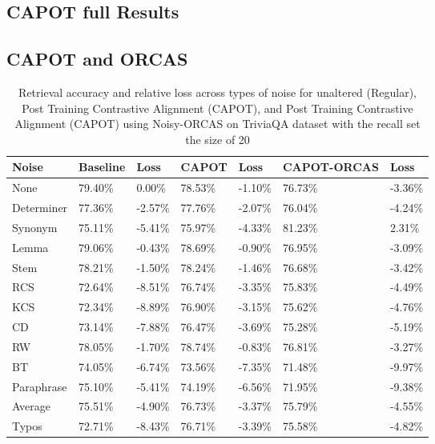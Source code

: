 \subsection{CAPOT full Results}
\label{app:capot}

\subsection{CAPOT and ORCAS}
\label{app:capot-orcas}
\begin{table*}[!ht]
    \centering
    \begin{tabular}{|l|l|l|l|l|l|l|}
    \hline
        Noise & Baseline & Loss & CAPOT & Loss & CAPOT-ORCAS & Loss \\ \hline
        None & 79.40\% & 0.00\% & 78.53\% & -1.10\% & 76.73\% & -3.36\% \\ \hline
        Determiner & 77.36\% & -2.57\% & 77.76\% & -2.07\% & 76.04\% & -4.24\% \\ \hline
        Synonym & 75.11\% & -5.41\% & 75.97\% & -4.33\% & 81.23\% & 2.31\% \\ \hline
        Lemma & 79.06\% & -0.43\% & 78.69\% & -0.90\% & 76.95\% & -3.09\% \\ \hline
        Stem & 78.21\% & -1.50\% & 78.24\% & -1.46\% & 76.68\% & -3.42\% \\ \hline
        RCS & 72.64\% & -8.51\% & 76.74\% & -3.35\% & 75.83\% & -4.49\% \\ \hline
        KCS & 72.34\% & -8.89\% & 76.90\% & -3.15\% & 75.62\% & -4.76\% \\ \hline
        CD & 73.14\% & -7.88\% & 76.47\% & -3.69\% & 75.28\% & -5.19\% \\ \hline
        RW & 78.05\% & -1.70\% & 78.74\% & -0.83\% & 76.81\% & -3.27\% \\ \hline
        BT & 74.05\% & -6.74\% & 73.56\% & -7.35\% & 71.48\% & -9.97\% \\ \hline
        Paraphrase & 75.10\% & -5.41\% & 74.19\% & -6.56\% & 71.95\% & -9.38\% \\ \hline
        Average & 75.51\% & -4.90\% & 76.73\% & -3.37\% & 75.79\% & -4.55\% \\ \hline
        Typos & 72.71\% & -8.43\% & 76.71\% & -3.39\% & 75.58\% & -4.82\% \\ \hline
    \end{tabular}
    \caption{Retrieval accuracy and relative loss across types of noise for unaltered (Regular),  Post Training Contrastive Alignment (CAPOT), and Post Training Contrastive Alignment (CAPOT) using Noisy-ORCAS on TriviaQA dataset with the recall set the size of 20}
    \label{tab:capot-orcasvsnot-20}
\end{table*}
